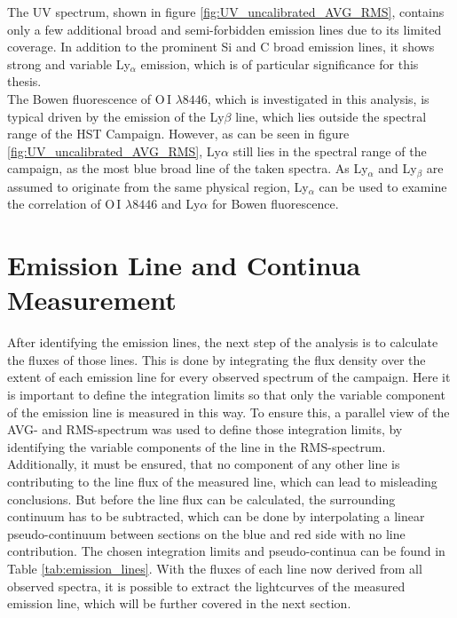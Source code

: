 The UV spectrum, shown in figure \ref{fig:UV_uncalibrated_AVG_RMS}, contains only a few additional broad and semi-forbidden emission lines due to its limited coverage. In addition to the prominent Si and C broad emission lines, it shows strong and variable Ly$_\alpha$ emission, which is of particular significance for this thesis. \\
The Bowen fluorescence of O\,I $\lambda 8446$, which is investigated in this analysis, is typical driven by the emission of the Ly$\beta$ line, which lies outside the spectral range of the HST Campaign. However, as can be seen in figure \ref{fig:UV_uncalibrated_AVG_RMS}, Ly$\alpha$  still lies in the spectral range of the campaign, as the most blue broad line of the taken spectra. As Ly$_\alpha$ and Ly$_\beta$ are assumed to originate from the same physical region, Ly$_\alpha$ can be used to examine the correlation of O\,I $\lambda 8446$ and Ly$\alpha$ for Bowen fluorescence.
 
 




\section{Emission Line and Continua Measurement}

After identifying the emission lines, the next step of the analysis is to calculate the fluxes of those lines. This is done by integrating the flux density over the extent of each emission line for every observed spectrum of the campaign. Here it is important to define the integration limits so that only the variable component of the emission line is measured in this way. To ensure this, a parallel view of the AVG- and RMS-spectrum was used to define those integration limits, by identifying the variable components of the line in the RMS-spectrum. Additionally, it must be ensured, that no component of any other line is contributing to the line flux of the measured line, which can lead to misleading conclusions. But before the line flux can be calculated, the surrounding continuum has to be subtracted, which can be done by interpolating a linear pseudo-continuum between sections on the blue and red side with no line contribution. The chosen integration limits and pseudo-continua can be found in Table \ref{tab:emission_lines}. With the fluxes of each line now derived from all observed spectra, it is possible to extract the lightcurves of the measured emission line, which will be further covered in the next section.

